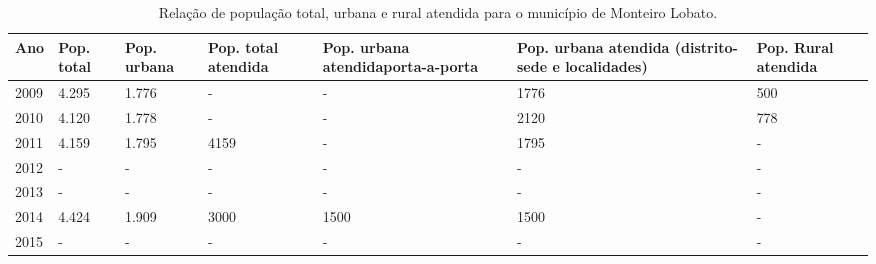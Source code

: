 \begin{table}
	\centering
	\caption{Relação de população total, urbana e rural atendida para o município de Monteiro Lobato.}
	\begin{tabular}{p{}|p{}|p{}|p{}|p{}|p{}|p{}}
		\rowcolor[rgb]{0.969,0.588,0.275} \textbf{Ano} & \textbf{Pop. total} & \textbf{Pop. urbana} & \textbf{Pop. total atendida} & \textbf{Pop. urbana atendidaporta-a-porta} & \textbf{Pop. urbana atendida (distrito-sede e localidades)} & \textbf{Pop. Rural atendida}  \\ 
		\hline
		\rowcolor[rgb]{0.984,0.831,0.706} 2009         & 4.295               & 1.776                & -                            & -                                          & 1776                                                        & 500                           \\ 
		\hline
		\rowcolor[rgb]{0.992,0.914,0.851} 2010         & 4.120               & 1.778                & -                            & -                                          & 2120                                                        & 778                           \\ 
		\hline
		\rowcolor[rgb]{0.984,0.831,0.706} 2011         & 4.159               & 1.795                & 4159                         & -                                          & 1795                                                        & -                             \\ 
		\hline
		\rowcolor[rgb]{0.992,0.914,0.851} 2012         & -                   & -                    & -                            & -                                          & -                                                           & -                             \\ 
		\hline
		\rowcolor[rgb]{0.984,0.831,0.706} 2013         & -                   & -                    & -                            & -                                          & -                                                           & -                             \\ 
		\hline
		\rowcolor[rgb]{0.992,0.914,0.851} 2014         & 4.424               & 1.909                & 3000                         & 1500                                       & 1500                                                        & -                             \\ 
		\hline
		\rowcolor[rgb]{0.984,0.831,0.706} 2015         & -                   & -                    & -                            & -                                          & -                                                           & -                            
	\end{tabular}
\end{table}